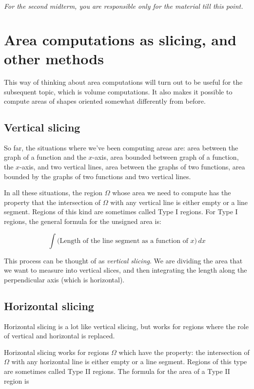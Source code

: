 \documentclass[10pt]{amsart}
\begin{document}
{\em For the second midterm, you are responsible only for the material
till this point.}

\section{Area computations as slicing, and other methods}

This way of thinking about area computations will turn out to be
useful for the subsequent topic, which is volume computations. It also
makes it possible to compute areas of shapes oriented somewhat
differently from before.

\subsection{Vertical slicing}

So far, the situations where we've been computing areas are: area
between the graph of a function and the $x$-axis, area bounded between
graph of a function, the $x$-axis, and two vertical lines, area
between the graphs of two functions, area bounded by the graphs of two
functions and two vertical lines.

In all these situations, the region $\Omega$ whose area we need to
compute has the property that the intersection of $\Omega$ with any
vertical line is either empty or a line segment. Regions of this kind
are sometimes called Type I regions. For Type I regions, the general
formula for the unsigned area is:

$$\int \text{(Length of the line segment as a function of $x$)} \, dx$$

This process can be thought of as {\em vertical slicing}. We are
dividing the area that we want to measure into vertical slices, and
then integrating the length along the perpendicular axis (which is
horizontal).

\subsection{Horizontal slicing}

Horizontal slicing is a lot like vertical slicing, but works for
regions where the role of vertical and horizontal is replaced.

Horizontal slicing works for regions $\Omega$ which have the property:
the intersection of $\Omega$ with any horizontal line is either empty
or a line segment. Regions of this type are sometimes called Type II
regions. The formula for the area of a Type II region is
\end{document}
